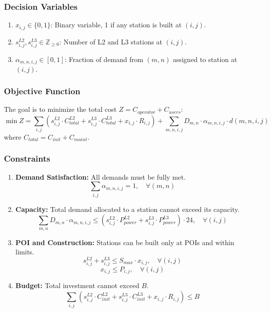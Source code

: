 \documentclass{article}
\begin{document}
\subsubsection{Decision Variables}
\begin{enumerate}
    \item $x_{i,j} \in \{0, 1\}$: Binary variable, 1 if any station is built at $(i,j)$.
    \item $s_{i,j}^{L2}, s_{i,j}^{L3} \in \mathbb{Z}_{\ge 0}$: Number of L2 and L3 stations at $(i,j)$.
    \item $\alpha_{m,n,i,j} \in [0, 1]$: Fraction of demand from $(m,n)$ assigned to station at $(i,j)$.
\end{enumerate}

\subsubsection{Objective Function}
The goal is to minimize the total cost $Z = C_{operator} + C_{users}$:
\begin{equation}
    \min Z = \sum_{i,j} \left( s_{i,j}^{L2} \cdot C_{total}^{L2} + s_{i,j}^{L3} \cdot C_{total}^{L3} + x_{i,j} \cdot R_{i,j} \right) + \sum_{m,n,i,j} D_{m,n} \cdot \alpha_{m,n,i,j} \cdot d(m,n,i,j)
\end{equation}
where $C_{total} = C_{init} + C_{maint}$.

\subsubsection{Constraints}
\begin{enumerate}
    \item \textbf{Demand Satisfaction:} All demands must be fully met.
    \begin{equation}
        \sum_{i,j} \alpha_{m,n,i,j} = 1, \quad \forall (m,n)
    \end{equation}
    \item \textbf{Capacity:} Total demand allocated to a station cannot exceed its capacity.
    \begin{equation}
        \sum_{m,n} D_{m,n} \cdot \alpha_{m,n,i,j} \le (s_{i,j}^{L2} \cdot P_{power}^{L2} + s_{i,j}^{L3} \cdot P_{power}^{L3}) \cdot 24, \quad \forall (i,j)
    \end{equation}
    \item \textbf{POI and Construction:} Stations can be built only at POIs and within limits.
    \begin{equation}
        s_{i,j}^{L2} + s_{i,j}^{L3} \le S_{max} \cdot x_{i,j}, \quad \forall (i,j)
    \end{equation}
    \begin{equation}
        x_{i,j} \le P_{i,j}, \quad \forall (i,j)
    \end{equation}
    \item \textbf{Budget:} Total investment cannot exceed $B$.
    \begin{equation}
        \sum_{i,j} (s_{i,j}^{L2} \cdot C_{init}^{L2} + s_{i,j}^{L3} \cdot C_{init}^{L3} + x_{i,j} \cdot R_{i,j}) \le B
    \end{equation}
\end{enumerate}
\end{document}
